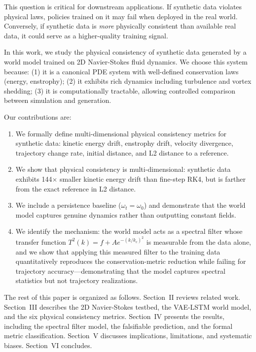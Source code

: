 \documentclass[reprint,aps,pre]{revtex4-2}
\begin{document}
This question is critical for downstream applications. If synthetic data violates physical laws, policies trained on it may fail when deployed in the real world. Conversely, if synthetic data is \textit{more} physically consistent than available real data, it could serve as a higher-quality training signal.

In this work, we study the physical consistency of synthetic data generated by a world model trained on 2D Navier-Stokes fluid dynamics. We choose this system because: (1) it is a canonical PDE system with well-defined conservation laws (energy, enstrophy); (2) it exhibits rich dynamics including turbulence and vortex shedding; (3) it is computationally tractable, allowing controlled comparison between simulation and generation.

Our contributions are:
\begin{enumerate}
\item We formally define multi-dimensional physical consistency metrics for synthetic data: kinetic energy drift, enstrophy drift, velocity divergence, trajectory change rate, initial distance, and L2 distance to a reference.
\item We show that physical consistency is multi-dimensional: synthetic data exhibits 144$\times$ smaller kinetic energy drift than fine-step RK4, but is farther from the exact reference in L2 distance.
\item We include a persistence baseline ($\omega_t = \omega_0$) and demonstrate that the world model captures genuine dynamics rather than outputting constant fields.
\item We identify the mechanism: the world model acts as a spectral filter whose transfer function $T^2(k) = f + Ae^{-(k/k_c)^2}$ is measurable from the data alone, and we show that applying this measured filter to the training data quantitatively reproduces the conservation-metric reduction while failing for trajectory accuracy---demonstrating that the model captures spectral statistics but not trajectory realizations.
\end{enumerate}

The rest of this paper is organized as follows. Section~II reviews related work. Section~III describes the 2D Navier-Stokes testbed, the VAE-LSTM world model, and the six physical consistency metrics. Section~IV presents the results, including the spectral filter model, the falsifiable prediction, and the formal metric classification. Section~V discusses implications, limitations, and systematic biases. Section~VI concludes.
\end{document}
